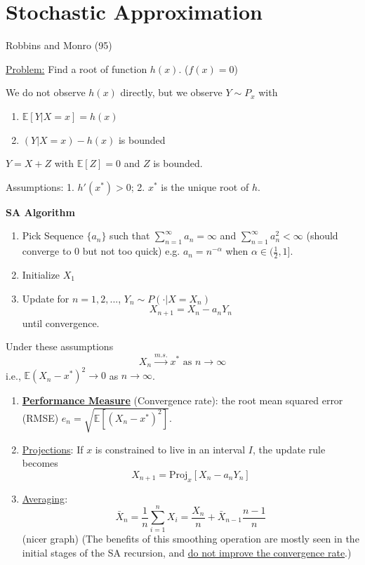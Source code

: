 \documentclass[11pt]{elegantbook}
\begin{document}
\section{Stochastic Approximation}
Robbins and Monro (95)

\underline{Problem:} Find a root of function $h(x)$. ($f(x)=0$)

We do not observe $h(x)$ directly, but we observe $Y\sim P_x$ with
\begin{enumerate}[(1)]
    \item $\mathbb{E}[Y|X=x]=h(x)$
    \item $(Y|X=x)-h(x)$ is bounded
\end{enumerate}
\begin{example}
    $Y=X+Z$ with $\mathbb{E}[Z]=0$ and $Z$ is bounded.
\end{example}
Assumptions: 1. $h'(x^*)>0$; 2. $x^*$ is the unique root of $h$.

\textbf{SA Algorithm}
\begin{enumerate}[$\bullet$]
    \item Pick Sequence $\{a_n\}$ such that $\sum_{n=1}^\infty a_n=\infty$ and $\sum_{n=1}^\infty a^2_n<\infty$ (should converge to $0$ but not too quick) e.g. $a_n=n^{-\alpha}$ when $\alpha\in (\frac{1}{2},1]$.
    \item Initialize $X_1$
    \item Update for $n=1,2,...$, $Y_n\sim P(\cdot|X=X_n)$ $$X_{n+1}=X_n-a_n Y_n$$ until convergence.
\end{enumerate}

\begin{theorem}
    Under these assumptions $$X_n \stackrel{m.s.}{\longrightarrow} x^*\text{ as }n \rightarrow \infty$$ i.e., $\mathbb{E}(X_n-x^*)^2 \rightarrow 0$ as $n \rightarrow \infty$.
\end{theorem}

\begin{enumerate}[$\bullet$]
    \item \textbf{\underline{Performance Measure}} (Convergence rate): the root mean squared error (RMSE) $e_n=\sqrt{\mathbb{E}[(X_n-x^*)^2]}$.
    \item \underline{Projections}: If $x$ is constrained to live in an interval $I$, the update rule becomes $$X_{n+1}=\text{Proj}_x[X_n-a_nY_n]$$
    \item \underline{Averaging}: $$\bar{X}_n=\frac{1}{n}\sum_{i=1}^nX_i=\frac{X_n}{n}+\bar{X}_{n-1}\frac{n-1}{n}$$(nicer graph) (The benefits of this smoothing operation are mostly seen in the initial stages of the SA recursion, and \underline{do not improve the convergence rate}.)
\end{enumerate}
\end{document}
